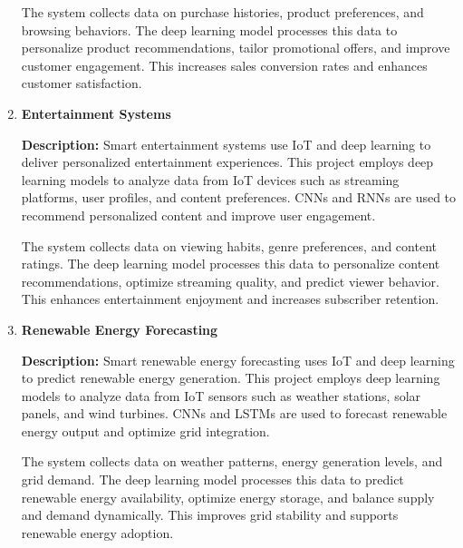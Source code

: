 \documentclass{article}
\begin{document}
\begin{enumerate}[label=\textbf{\arabic*.}, leftmargin=*]
The system collects data on purchase histories, product preferences, and browsing behaviors. The deep learning model processes this data to personalize product recommendations, tailor promotional offers, and improve customer engagement. This increases sales conversion rates and enhances customer satisfaction.



\vspace{24pt} %
\item \textbf{Entertainment Systems}

\textbf{Description:}
Smart entertainment systems use IoT and deep learning to deliver personalized entertainment experiences. This project employs deep learning models to analyze data from IoT devices such as streaming platforms, user profiles, and content preferences. CNNs and RNNs are used to recommend personalized content and improve user engagement.

The system collects data on viewing habits, genre preferences, and content ratings. The deep learning model processes this data to personalize content recommendations, optimize streaming quality, and predict viewer behavior. This enhances entertainment enjoyment and increases subscriber retention.



\vspace{24pt} %
\item \textbf{Renewable Energy Forecasting}

\textbf{Description:}
Smart renewable energy forecasting uses IoT and deep learning to predict renewable energy generation. This project employs deep learning models to analyze data from IoT sensors such as weather stations, solar panels, and wind turbines. CNNs and LSTMs are used to forecast renewable energy output and optimize grid integration.

The system collects data on weather patterns, energy generation levels, and grid demand. The deep learning model processes this data to predict renewable energy availability, optimize energy storage, and balance supply and demand dynamically. This improves grid stability and supports renewable energy adoption.


\end{enumerate}
\end{document}
